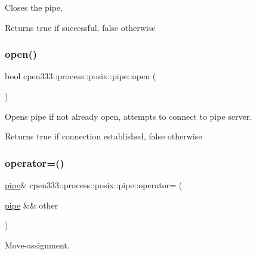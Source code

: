 Closes the pipe. 

\begin{DoxyReturn}{Returns}
true if successful, false otherwise 
\end{DoxyReturn}
\mbox{\label{classcpen333_1_1process_1_1posix_1_1pipe_a256fbc6e54cf558ee06c5f3b65d5dc23}} 
\subsubsection{\texorpdfstring{open()}{open()}}
{\footnotesize\ttfamily bool cpen333\+::process\+::posix\+::pipe\+::open (\begin{DoxyParamCaption}{ }\end{DoxyParamCaption})\hspace{0.3cm}{\ttfamily [inline]}}



Opens pipe if not already open, attempts to connect to pipe server. 

\begin{DoxyReturn}{Returns}
true if connection established, false otherwise 
\end{DoxyReturn}
\mbox{\label{classcpen333_1_1process_1_1posix_1_1pipe_ab0715b21ad951bff7da956bfe71c51d7}} 
\subsubsection{\texorpdfstring{operator=()}{operator=()}}
{\footnotesize\ttfamily \hyperlink{classcpen333_1_1process_1_1posix_1_1pipe}{pipe}\& cpen333\+::process\+::posix\+::pipe\+::operator= (\begin{DoxyParamCaption}\item[{\hyperlink{classcpen333_1_1process_1_1posix_1_1pipe}{pipe} \&\&}]{other }\end{DoxyParamCaption})\hspace{0.3cm}{\ttfamily [inline]}}



Move-\/assignment. 


